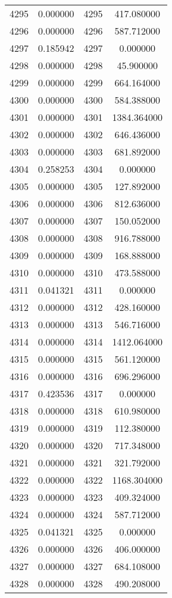 \documentclass[12pt]{article}
\begin{document}
\begin{longtable}{@{}cccc@{}}
4295 & 0.000000 & 4295 & 417.080000 \\
4296 & 0.000000 & 4296 & 587.712000 \\
4297 & 0.185942 & 4297 & 0.000000 \\
4298 & 0.000000 & 4298 & 45.900000 \\
4299 & 0.000000 & 4299 & 664.164000 \\
4300 & 0.000000 & 4300 & 584.388000 \\
4301 & 0.000000 & 4301 & 1384.364000 \\
4302 & 0.000000 & 4302 & 646.436000 \\
4303 & 0.000000 & 4303 & 681.892000 \\
4304 & 0.258253 & 4304 & 0.000000 \\
4305 & 0.000000 & 4305 & 127.892000 \\
4306 & 0.000000 & 4306 & 812.636000 \\
4307 & 0.000000 & 4307 & 150.052000 \\
4308 & 0.000000 & 4308 & 916.788000 \\
4309 & 0.000000 & 4309 & 168.888000 \\
4310 & 0.000000 & 4310 & 473.588000 \\
4311 & 0.041321 & 4311 & 0.000000 \\
4312 & 0.000000 & 4312 & 428.160000 \\
4313 & 0.000000 & 4313 & 546.716000 \\
4314 & 0.000000 & 4314 & 1412.064000 \\
4315 & 0.000000 & 4315 & 561.120000 \\
4316 & 0.000000 & 4316 & 696.296000 \\
4317 & 0.423536 & 4317 & 0.000000 \\
4318 & 0.000000 & 4318 & 610.980000 \\
4319 & 0.000000 & 4319 & 112.380000 \\
4320 & 0.000000 & 4320 & 717.348000 \\
4321 & 0.000000 & 4321 & 321.792000 \\
4322 & 0.000000 & 4322 & 1168.304000 \\
4323 & 0.000000 & 4323 & 409.324000 \\
4324 & 0.000000 & 4324 & 587.712000 \\
4325 & 0.041321 & 4325 & 0.000000 \\
4326 & 0.000000 & 4326 & 406.000000 \\
4327 & 0.000000 & 4327 & 684.108000 \\
4328 & 0.000000 & 4328 & 490.208000 \\

\end{longtable}
\end{document}
